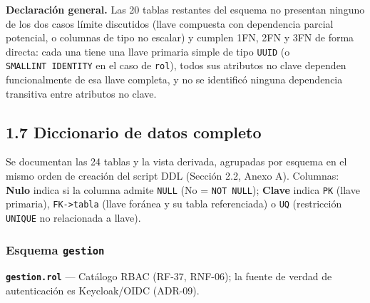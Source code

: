 \documentclass[11pt,a4paper]{article}
\begin{document}
\textbf{Declaración general.} Las 20 tablas restantes del esquema no presentan ninguno de los dos casos límite discutidos (llave compuesta con dependencia parcial potencial, o columnas de tipo no escalar) y cumplen 1FN, 2FN y 3FN de forma directa: cada una tiene una llave primaria simple de tipo \texttt{UUID} (o \texttt{SMALLINT\ IDENTITY} en el caso de \texttt{rol}), todos sus atributos no clave dependen funcionalmente de esa llave completa, y no se identificó ninguna dependencia transitiva entre atributos no clave.

\subsection{1.7 Diccionario de datos completo}\label{diccionario-de-datos-completo}

Se documentan las 24 tablas y la vista derivada, agrupadas por esquema en el mismo orden de creación del script DDL (Sección 2.2, Anexo A). Columnas: \textbf{Nulo} indica si la columna admite \texttt{NULL} (No = \texttt{NOT\ NULL}); \textbf{Clave} indica \texttt{PK} (llave primaria), \texttt{FK-\textgreater{}tabla} (llave foránea y su tabla referenciada) o \texttt{UQ} (restricción \texttt{UNIQUE} no relacionada a llave).

\subsubsection{\texorpdfstring{Esquema \texttt{gestion}}{Esquema gestion}}\label{esquema-gestion}

\textbf{\texttt{gestion.rol}} --- Catálogo RBAC (RF-37, RNF-06); la fuente de verdad de autenticación es Keycloak/OIDC (ADR-09).
\end{document}

